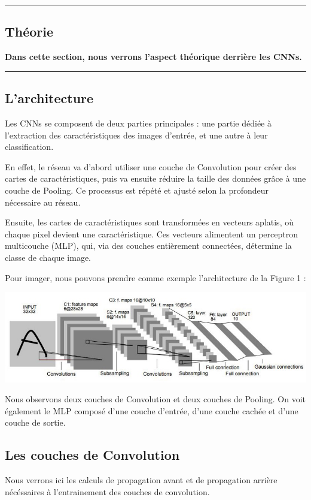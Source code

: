 {\color{gray}\hrule}
\begin{center}
\section{Théorie}
\textbf{Dans cette section, nous verrons l'aspect théorique derrière les CNNs.}
\bigskip
\end{center}
{\color{gray}\hrule}
\begin{multicols}{2}
\subsection{L'architecture}
Les CNNs se composent de deux parties principales :  
une partie dédiée à l’extraction des caractéristiques des images d’entrée, et une autre 
à leur classification.

En effet, le réseau va d'abord utiliser une couche de Convolution 
pour créer des cartes de caractéristiques, puis va ensuite réduire la taille des 
données grâce à une couche de Pooling. 
Ce processus est répété et ajusté selon la profondeur nécessaire au réseau.

Ensuite, les cartes de caractéristiques sont transformées en vecteurs aplatis, 
où chaque pixel devient une caractéristique. Ces vecteurs alimentent un perceptron
multicouche (MLP), qui, via des couches entièrement connectées, détermine la classe de 
chaque image.

Pour imager, nous pouvons prendre comme exemple l'architecture de la Figure 1 : 


\includegraphics[width=\columnwidth]{images/lenet5.jpeg}
\hfill\break

Nous observons deux couches de Convolution et deux couches de Pooling. On voit également le  
MLP composé d'une couche d'entrée, d'une couche cachée et d'une couche de sortie.

\subsection{Les couches de Convolution}
Nous verrons ici les calculs de propagation avant et de propagation arrière nécéssaires 
à l'entrainement des couches de convolution.\\


\end{multicols}
